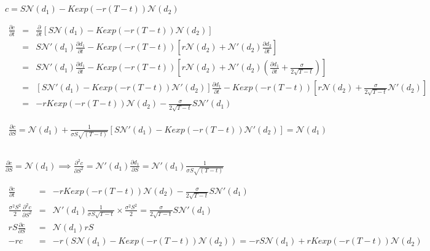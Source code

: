 \documentclass[11pt, fleqn]{article}
\begin{document}
\subsection{}
$c = S\mathcal{N}(d_1) - Kexp(-r(T-t))\mathcal{N}(d_2)$

\begin{eqnarray*}
\frac{\partial c}{\partial t} &=& \frac{\partial}{\partial t}[S\mathcal{N}(d_1) - Kexp(-r(T-t))\mathcal{N}(d_2)] \\
&=& S\mathcal{N}'(d_1)\frac{\partial d_1}{\partial t} - Kexp(-r(T-t))[r\mathcal{N}(d_2) + \mathcal{N}'(d_2)\frac{\partial d_2}{\partial t}]\\
&=& S\mathcal{N}'(d_1)\frac{\partial d_1}{\partial t} - Kexp(-r(T-t))[r\mathcal{N}(d_2) + \mathcal{N}'(d_2)(\frac{\partial d_1}{\partial t} + \frac{\sigma}{2\sqrt{T-t}})]\\
&=& [S\mathcal{N}'(d_1) - Kexp(-r(T-t))\mathcal{N}'(d_2)]\frac{\partial d_1}{\partial t} - Kexp(-r(T-t))[r\mathcal{N}(d_2) + \frac{\sigma}{2\sqrt{T-t}}\mathcal{N}'(d_2)]\\
&=& -rKexp(-r(T-t))\mathcal{N}(d_2) - \frac{\sigma}{2\sqrt{T-t}}S\mathcal{N}'(d_1)
\end{eqnarray*}

\begin{eqnarray*}
\frac{\partial c}{\partial S} = \mathcal{N}(d_1) + \frac{1}{\sigma S \sqrt{(T-t)}}[S\mathcal{N}'(d_1) - Kexp(-r(T-t))\mathcal{N}'(d_2)] = \mathcal{N}(d_1)
\end{eqnarray*}

\subsection{}
$
\frac{\partial c}{\partial S} = \mathcal{N}(d_1)
\implies \frac{\partial^2 c}{\partial S^2} = \mathcal{N}'(d_1)\frac{\partial d_1}{\partial S} = \mathcal{N}'(d_1)\frac{1}{\sigma S \sqrt{(T-t)}}
$

\vspace{-0.5cm}

\begin{eqnarray*}
\frac{\partial c}{\partial t} &=& -rKexp(-r(T-t))\mathcal{N}(d_2) - \frac{\sigma}{2\sqrt{T-t}}S\mathcal{N}'(d_1) \\
\frac{\sigma^2S^2}{2}\frac{\partial^2 c}{\partial S^2} &=& \mathcal{N}'(d_1)\frac{1}{\sigma S \sqrt{T-t}}\times\frac{\sigma^2S^2}{2} = \frac{\sigma}{2\sqrt{T-t}}S\mathcal{N}'(d_1)\\
rS\frac{\partial c}{\partial S} &=& \mathcal{N}(d_1)rS\\
-rc &=& -r(S\mathcal{N}(d_1) - Kexp(-r(T-t))\mathcal{N}(d_2)) = -rS\mathcal{N}(d_1) + rKexp(-r(T-t))\mathcal{N}(d_2)
\end{eqnarray*}
\end{document}
